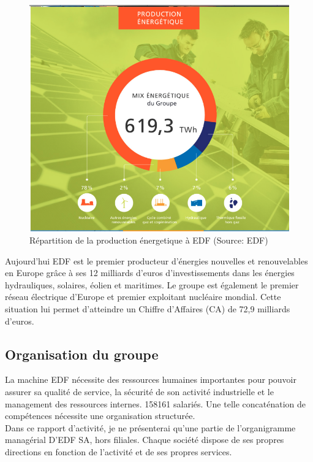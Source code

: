 \documentclass[11pt,a4paper]{article}
\begin{document}
\begin{figure}
 \centering
 \includegraphics[scale=0.5]{production.png}
 \caption{Répartition de la production énergetique à EDF (Source: EDF)}
 \label{figure_production}
\end{figure}
Aujourd’hui EDF est le premier producteur d’énergies nouvelles et renouvelables en Europe grâce à ses 12 milliards d’euros d’investissements dans les énergies hydrauliques, solaires, éolien et maritimes.
Le groupe est également le premier réseau électrique d’Europe et premier exploitant nucléaire mondial.
Cette situation lui permet d’atteindre un Chiffre d’Affaires (CA) de 72,9 milliards d’euros.

\subsection{Organisation du groupe}
La machine EDF nécessite des ressources humaines importantes pour pouvoir assurer sa qualité de service, la sécurité de son activité industrielle et le management des ressources internes. 158161 salariés. Une telle concaténation de compétences nécessite une organisation structurée.\\
Dans ce rapport d’activité, je ne présenterai qu’une partie de l’organigramme managérial D’EDF SA, hors filiales. Chaque société dispose de ses propres directions en fonction de l’activité et de ses propres services.
\end{document}
